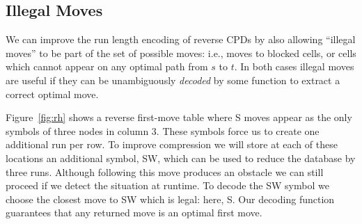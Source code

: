  
\subsection{Illegal Moves}

We can improve the run length encoding of reverse CPDs by also allowing
``illegal moves'' to be part of the set of possible moves: i.e., moves
to blocked cells, or cells which cannot appear on any optimal path from
$s$ to $t$.  In both cases illegal moves are useful if they can be 
unambiguously \emph{decoded} by some function to extract a correct 
optimal move.

\begin{example}
Figure~\ref{fig:rh} shows a reverse first-move table where
S moves appear as the only symbols of three nodes in column 3. 
These symbols force us to create one additional run per row. 
To improve compression we will store at each of these locations 
an additional symbol, SW, which can be used to reduce the database 
by three runs.
Although following this move produces an obstacle we can still
proceed if we detect the situation at runtime.
To decode the SW symbol we choose the closest move to SW which 
is legal: here, S. Our decoding function guarantees that any
returned move is an optimal first move.
\end{example}

  
%  


